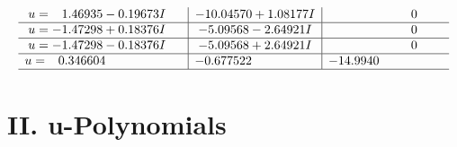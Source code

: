 \documentclass[1p]{elsarticle_modified}
\theoremstyle{definition}
\begin{document}
$$\begin{array}{c|c|c}
\begin{aligned}
u &= \phantom{-}1.46935 - 0.19673 I\end{aligned}
 & -10.04570 + 1.08177 I & \phantom{-0.000000 } 0 \\ \hline\begin{aligned}
u &= -1.47298 + 0.18376 I\end{aligned}
 & -5.09568 - 2.64921 I & \phantom{-0.000000 } 0 \\ \hline\begin{aligned}
u &= -1.47298 - 0.18376 I\end{aligned}
 & -5.09568 + 2.64921 I & \phantom{-0.000000 } 0 \\ \hline\begin{aligned}
u &= \phantom{-}0.346604\phantom{ +0.000000I}\end{aligned}
 & -0.677522\phantom{ +0.000000I} & -14.9940\phantom{ +0.000000I}\\
 \hline 
 \end{array}$$\newpage
\newpage\renewcommand{\arraystretch}{1}
\centering \section*{ II. u-Polynomials}
\end{document}
